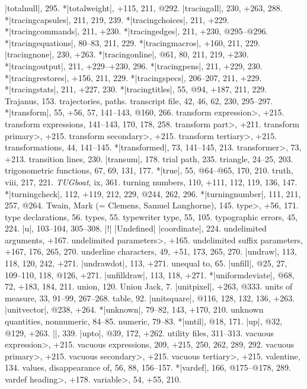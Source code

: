 |totalnull|, 295.
*|totalweight|, +115, 211, @292.
|tracingall|, 230, +263, 288.
*|tracingcapsules|, 211, 219, 239.
*|tracingchoices|, 211, +229.
*|tracingcommands|, 211, +230.
*|tracingedges|, 211, +230, @295--@296.
*|tracingequations|, 80--83, 211, 229.
*|tracingmacros|, +160, 211, 229.
|tracingnone|, 230, +263.
*|tracingonline|, @61, 80, 211, 219, +230.
*|tracingoutput|, 211, +229--+230, 296.
*|tracingpens|, 211, +229, 230.
*|tracingrestores|, +156, 211, 229.
*|tracingspecs|, 206--207, 211, +229.
*|tracingstats|, 211, +227, 230.
*|tracingtitles|, 55, @94, +187, 211, 229.
Trajanus, 153.
trajectories, \see paths.
transcript file, 42, 46, 62, 230, 295--297.
*|transform|, 55, +56, 57, 141--143, @160, 266.
\<transform expression>, +215.
transform expressions, 141--143, 170, 178, 258.
\<transform part>, +211.
\<transform primary>, +215.
\<transform secondary>, +215.
\<transform tertiary>, +215.
transformations, 44, 141--145.
*|transformed|, 73, 141--145, 213.
\<transformer>, 73, +213.
transition lines, 230.
|transum|, 178.
trial path, 235.
triangle, 24--25, 203.
trigonometric functions, 67, 69, 131, 177.
*|true|, 55, @64--@65, 170, 210.
truth, viii, 217, 221.
{\sl TUGboat}, ix, 361.
turning numbers, 110, +111, 112, 119, 136, 147.
*|turningcheck|, 112, +119, 212, 229, @244, 262, 296.
*|turningnumber|, 111, 211, 257, @264.
Twain, Mark (= Clemens, Samuel Langhorne), 145.
\<type>, +56, 171.
type declarations, 56.
types, 55.
typewriter type, 55, 105.
typographic errors, 45, 224.
\newletter
|u|, 103--104, 305--308.
|!| |Undefined| |coordinate|, 224.
undelimited arguments, +167.
\<undelimited parameters>, +165.
undelimited suffix parameters, +167, 176, 265, 270.
underline characters, 49, +51, 173, 265, 270.
|undraw|, 113, 118, 120, 242, +271.
|undrawdot|, 113, +271.
unequal to, 65.
|unfill|, @25, 27, 109--110, 118, @126, +271.
|unfilldraw|, 113, 118, +271.
*|uniformdeviate|, @68, 72, +183, 184, 211.
union, 120.
Union Jack, 7.
|unitpixel|, +263, @333.
units of measure, 33, 91--99, 267--268.
\sub table, 92.
|unitsquare|, @116, 128, 132, 136, +263.
|unitvector|, @238, +264.
*|unknown|, 79--82, 143, +170, 210.
unknown quantities, nonnumeric, 84--85.
\sub numeric, 79--83.
*|until|, @18, 171.
|up|, @32, @129, +263.
|\uppers|, 339.
|upto|, @39, 172, +262.
utility files, 311--313.
\newletter
\<vacuous expression>, +215.
vacuous expressions, 209, +215, 250, 262, 289, 292.
\<vacuous primary>, +215.
\<vacuous secondary>, +215.
\<vacuous tertiary>, +215.
valentine, 134.
values, disappearance of, 56, 88, 156--157.
*|vardef|, 166, @175--@178, 289.
\<vardef heading>, +178.
\<variable>, 54, +55, 210.
